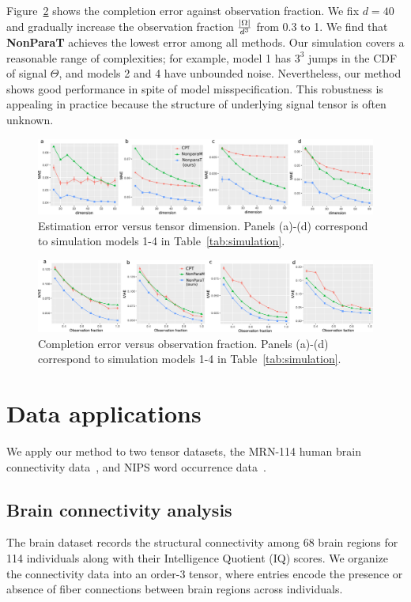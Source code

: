 \documentclass[11pt]{article}
\theoremstyle{plain}
\theoremstyle{definition}
\begin{document}
Figure~\ref{fig:compare2} shows the completion error against observation fraction. We fix $d=40$ and gradually increase the observation fraction ${|\Omega|\over d^3}$ from 0.3 to 1. We find that {\bf NonParaT} achieves the lowest error among all methods. Our simulation covers a reasonable range of  complexities; for example, model 1 has $3^3$ jumps in the CDF of signal $\Theta$, and models 2 and 4 have unbounded noise. Nevertheless, our method shows good performance in spite of model misspecification. This robustness is appealing in practice because the structure of underlying signal tensor is often unknown. 

\begin{figure}[h!]
\includegraphics[width=\textwidth]{figure/fig1-4v2.pdf}
\caption{Estimation error versus tensor dimension. Panels (a)-(d) correspond to simulation models 1-4 in Table~\ref{tab:simulation}.}\label{fig:compare1}
\end{figure}


\begin{figure}[h!]
\includegraphics[width=\textwidth]{figure/fig5-8v2.pdf}
\caption{Completion error versus observation fraction. Panels (a)-(d) correspond to simulation models 1-4 in Table~\ref{tab:simulation}. }\label{fig:compare2}
\end{figure}

\section{Data applications}
We apply our method to two tensor datasets, the MRN-114 human brain connectivity data~\citep{wang2017bayesian}, and NIPS word occurrence data~\citep{globerson2007euclidean}. 

\subsection{Brain connectivity analysis}
The brain dataset records the structural connectivity among 68 brain regions for 114 individuals along with their Intelligence Quotient (IQ) scores. We organize the connectivity data into an order-3 tensor, where entries encode the presence or absence of fiber connections between brain regions across individuals. 
\end{document}
